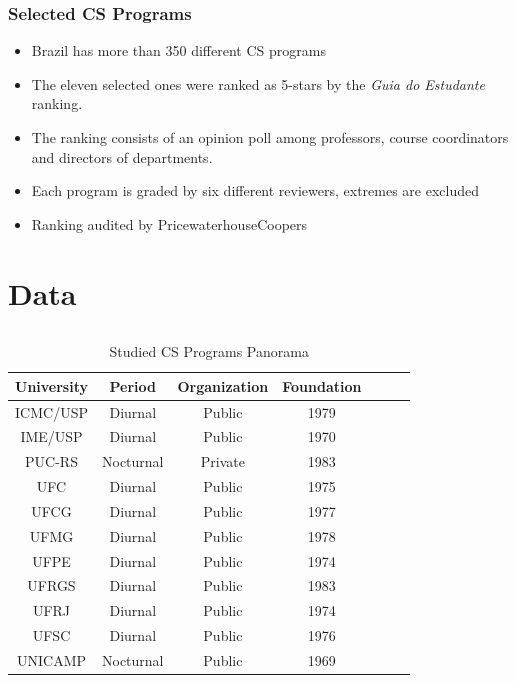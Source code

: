 \documentclass{beamer}
\begin{document}
\begin{frame}
\frametitle{Selected CS Programs}
\begin{itemize}
	\item Brazil has more than 350 different CS programs
	\item The eleven selected ones were ranked as 5-stars by the \emph{Guia do
	Estudante} ranking. 
	\item The ranking consists of an opinion poll among professors, course
	coordinators and directors of departments.
	\item Each program is graded by six different reviewers, extremes are excluded
	\item Ranking audited by PricewaterhouseCoopers
\end{itemize}
\end{frame}

\section{Data}
\subsection{}

\begin{frame}
\begin{table}
	\scriptsize
	\caption{Studied CS Programs Panorama}
    \begin{tabular}{|c|c|c|c|c|c|c|}
        \hline
        University  & Period    & Organization & Foundation   \\ \hline
        ICMC/USP    & Diurnal   & Public       & 1979         \\ 
        IME/USP     & Diurnal   & Public       & 1970         \\ 
        PUC-RS      & Nocturnal & Private      & 1983         \\ 
        UFC         & Diurnal   & Public       & 1975         \\ 
        UFCG        & Diurnal   & Public       & 1977         \\ 
        UFMG        & Diurnal   & Public       & 1978         \\ 
        UFPE        & Diurnal   & Public       & 1974         \\ 
        UFRGS       & Diurnal   & Public       & 1983         \\ 
        UFRJ        & Diurnal   & Public       & 1974         \\ 
        UFSC        & Diurnal   & Public       & 1976         \\ 
        UNICAMP     & Nocturnal & Public       & 1969         \\
        \hline
    \end{tabular}
\end{table}
\end{frame}
\end{document}
